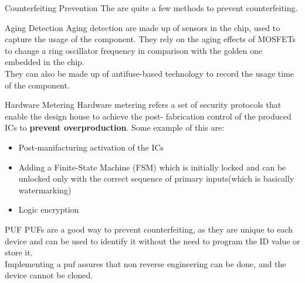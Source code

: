 \begin{section}{Counterfeiting Prevention}
  The are quite a few methods to prevent counterfeiting.
  \begin{subsection}{Aging Detection}
    Aging detection are made up of sensors in the chip, used to capture the usage of the component.
    They rely on the aging effects of MOSFETs to change a ring oscillator frequency in comparison
    with the golden one embedded in the chip.\\
    They can also be made up of antifuse-based technology to record the usage time of the component.
  \end{subsection}

  \begin{subsection}{Hardware Metering}
    Hardware metering refers a set of security protocols that enable the design house to achieve the
    post- fabrication control of the produced ICs to \textbf{prevent overproduction}.
    Some example of this are:
    \begin{itemize}
      \item Post-manifacturing activation of the ICs
      \item Adding a Finite-State Machine (FSM) which is initially locked and can be unlocked only
        with the correct sequence of primary inputs(which is basically watermarking)
      \item Logic encryption
    \end{itemize}
  \end{subsection}
  \begin{subsection}{PUF}
    PUFs are a good way to prevent counterfeiting, as they are unique to each device and can be used
    to identify it without the need to program the ID value or store it.\\
    Implementing a puf assures that non reverse engineering can be done, and the device cannot be
    cloned.
  \end{subsection}
\end{section}
